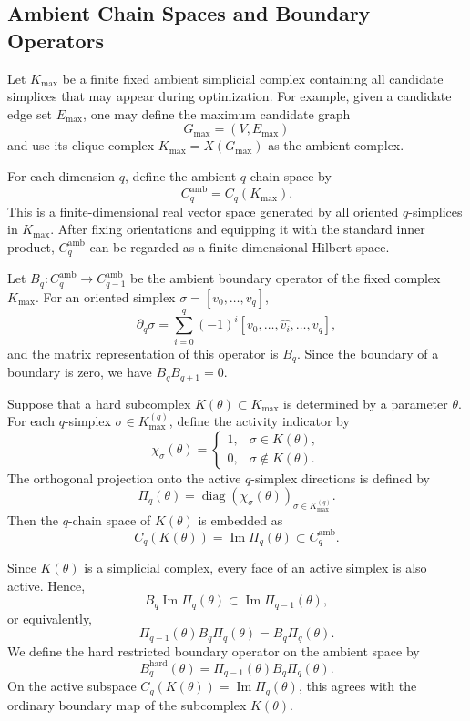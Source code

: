 \documentclass[pdflatex,sn-mathphys-ay]{sn-jnl}%
\theoremstyle{thmstyleone}%
\theoremstyle{thmstyletwo}%
\theoremstyle{thmstylethree}%
\begin{document}
\subsection{Ambient Chain Spaces and Boundary Operators}

Let \(K_{\max}\) be a finite fixed ambient simplicial complex containing all candidate simplices that may appear during optimization. For example, given a candidate edge set \(E_{\max}\), one may define the maximum candidate graph
\[
G_{\max}=(V,E_{\max})
\]
and use its clique complex \(K_{\max}=X(G_{\max})\) as the ambient complex.

For each dimension \(q\), define the ambient \(q\)-chain space by
\[
C_q^{\mathrm{amb}}=C_q(K_{\max}).
\]
This is a finite-dimensional real vector space generated by all oriented \(q\)-simplices in \(K_{\max}\). After fixing orientations and equipping it with the standard inner product, \(C_q^{\mathrm{amb}}\) can be regarded as a finite-dimensional Hilbert space.

Let \(B_q:C_q^{\mathrm{amb}}\to C_{q-1}^{\mathrm{amb}}\) be the ambient boundary operator of the fixed complex \(K_{\max}\). For an oriented simplex \(\sigma=[v_0,\ldots,v_q]\),
\[
\partial_q\sigma
=
\sum_{i=0}^{q}
(-1)^i
[v_0,\ldots,\widehat{v_i},\ldots,v_q],
\]
and the matrix representation of this operator is \(B_q\). Since the boundary of a boundary is zero, we have \(B_qB_{q+1}=0\).

Suppose that a hard subcomplex \(K(\theta)\subset K_{\max}\) is determined by a parameter \(\theta\). For each \(q\)-simplex \(\sigma\in K_{\max}^{(q)}\), define the activity indicator by
\[
\chi_\sigma(\theta)
=
\begin{cases}
1, & \sigma\in K(\theta),\\
0, & \sigma\notin K(\theta).
\end{cases}
\]
The orthogonal projection onto the active \(q\)-simplex directions is defined by
\[
\Pi_q(\theta)
=
\operatorname{diag}
\left(
\chi_\sigma(\theta)
\right)_{\sigma\in K_{\max}^{(q)}}.
\]
Then the \(q\)-chain space of \(K(\theta)\) is embedded as
\[
C_q(K(\theta))=\operatorname{Im}\Pi_q(\theta)
\subset C_q^{\mathrm{amb}}.
\]

Since \(K(\theta)\) is a simplicial complex, every face of an active simplex is also active. Hence,
\[
B_q\operatorname{Im}\Pi_q(\theta)
\subset
\operatorname{Im}\Pi_{q-1}(\theta),
\]
or equivalently,
\[
\Pi_{q-1}(\theta)B_q\Pi_q(\theta)
=
B_q\Pi_q(\theta).
\]
We define the hard restricted boundary operator on the ambient space by
\[
B_q^{\mathrm{hard}}(\theta)
=
\Pi_{q-1}(\theta)B_q\Pi_q(\theta).
\]
On the active subspace \(C_q(K(\theta))=\operatorname{Im}\Pi_q(\theta)\), this agrees with the ordinary boundary map of the subcomplex \(K(\theta)\).
\end{document}
